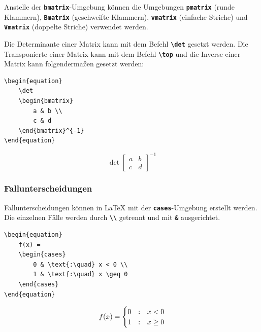 Anstelle der \textbf{\texttt{bmatrix}}-Umgebung können die Umgebungen \textbf{\texttt{pmatrix}} (runde Klammern), \textbf{\texttt{Bmatrix}} (geschweifte Klammern), \textbf{\texttt{vmatrix}} (einfache Striche) und \textbf{\texttt{Vmatrix}} (doppelte Striche) verwendet werden.

Die Determinante einer Matrix kann mit dem Befehl \textbf{\texttt{\textbackslash det}} gesetzt werden. Die Transponierte einer Matrix kann mit dem Befehl \textbf{\texttt{\textbackslash top}} und die Inverse einer Matrix kann folgendermaßen gesetzt werden:

\begin{minipage}{0.5\textwidth}
    \begin{lstlisting}[language={[LaTeX]TeX}]
\begin{equation}
    \det
    \begin{bmatrix}
        a & b \\
        c & d
    \end{bmatrix}^{-1}
\end{equation}
\end{lstlisting}
\end{minipage}
\hfill
\begin{minipage}{0.5\textwidth}
    \begin{equation}
        \det
        \begin{bmatrix}
            a & b \\
            c & d
        \end{bmatrix}^{-1}
    \end{equation}
\end{minipage}



\subsubsection{Fallunterscheidungen}
Fallunterscheidungen können in \LaTeX{} mit der \textbf{\texttt{cases}}-Umgebung erstellt werden. Die einzelnen Fälle werden durch \textbf{\texttt{\textbackslash\textbackslash}} getrennt und mit \textbf{\texttt{\&}} ausgerichtet.

\begin{minipage}{0.5\textwidth}
    \begin{lstlisting}[language={[LaTeX]TeX}]
\begin{equation}
    f(x) =
    \begin{cases}
        0 & \text{:\quad} x < 0 \\
        1 & \text{:\quad} x \geq 0
    \end{cases}
\end{equation}
\end{lstlisting}
\end{minipage}
\hfill
\begin{minipage}{0.5\textwidth}
    \begin{equation}
        f(x) =
        \begin{cases}
            0 & \text{:\quad} x < 0    \\
            1 & \text{:\quad} x \geq 0
        \end{cases}
    \end{equation}
\end{minipage}


